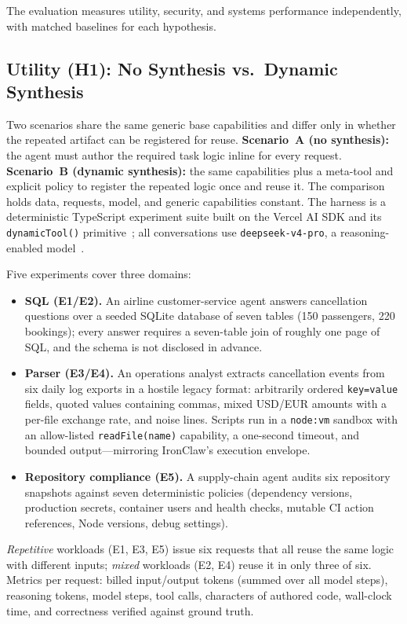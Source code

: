 \documentclass[conference]{IEEEtran}
\newcommand{\toolname}{IronClaw}
\begin{document}
The evaluation measures utility, security, and systems performance
independently, with matched baselines for each hypothesis.

\subsection{Utility (H1): No Synthesis vs.\ Dynamic Synthesis}
Two scenarios share the same generic base capabilities and differ only in
whether the repeated artifact can be registered for reuse. \textbf{Scenario~A
(no synthesis):} the agent must author the required task logic inline for every
request. \textbf{Scenario~B (dynamic synthesis):} the same capabilities plus a
meta-tool and explicit policy to register the repeated logic once and reuse it.
The comparison holds data, requests, model, and generic capabilities constant.
The harness is a deterministic TypeScript experiment suite built on the Vercel
AI SDK and its \texttt{dynamicTool()} primitive~\cite{aisdk}; all conversations
use \texttt{deepseek-v4-pro}, a reasoning-enabled model~\cite{deepseek}.

Five experiments cover three domains:
\begin{itemize}
\item \textbf{SQL (E1/E2).} An airline customer-service agent answers
cancellation questions over a seeded SQLite database of seven tables (150
passengers, 220 bookings); every answer requires a seven-table join of roughly
one page of SQL, and the schema is not disclosed in advance.
\item \textbf{Parser (E3/E4).} An operations analyst extracts cancellation
events from six daily log exports in a hostile legacy format: arbitrarily
ordered \texttt{key=value} fields, quoted values containing commas, mixed
USD/EUR amounts with a per-file exchange rate, and noise lines. Scripts run in
a \texttt{node:vm} sandbox with an allow-listed \texttt{readFile(name)}
capability, a one-second timeout, and bounded output---mirroring \toolname{}'s
execution envelope.
\item \textbf{Repository compliance (E5).} A supply-chain agent audits six
repository snapshots against seven deterministic policies (dependency versions,
production secrets, container users and health checks, mutable CI action
references, Node versions, debug settings).
\end{itemize}
\emph{Repetitive} workloads (E1, E3, E5) issue six requests that all reuse the
same logic with different inputs; \emph{mixed} workloads (E2, E4) reuse it in
only three of six. Metrics per request: billed input/output tokens (summed over
all model steps), reasoning tokens, model steps, tool calls, characters of
authored code, wall-clock time, and correctness verified against ground truth.
\end{document}
